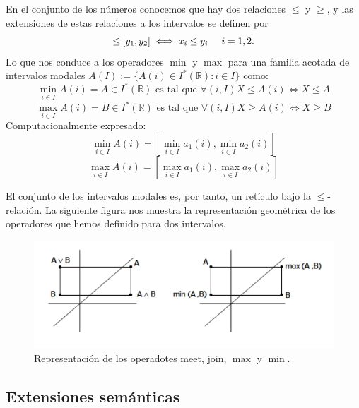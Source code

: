 En el conjunto de los números conocemos que hay dos relaciones $\leq$ y $\geq$, y las extensiones de estas relaciones a los intervalos se definen por
\begin{equation}
[x_1,x_2] \leq [y_1,y_2] \iff x_i \leq y_i \hspace{0.5cm} i = 1,2.
\nonumber
\end{equation}
Lo que nos conduce a los operadores $\min$ y $\max$ para una familia acotada de intervalos modales $A(I) := \{ A(i) \in I^*(\mathbb{R}) : i \in I \}$ como:
\begin{equation}
\min_{i \in I} A(i) = A \in I^*(\mathbb{R}) \text{ es  tal que } \forall (i,I) X \leq A(i) \iff X \leq A
\nonumber
\end{equation}
\begin{equation}
\max_{i \in I} A(i) = B \in I^*(\mathbb{R}) \text{ es  tal que } \forall (i,I) X \geq A(i) \iff X \geq B
\nonumber
\end{equation}
Computacionalmente expresado:
\begin{equation}
\min_{i \in I} A(i) = [\min_{i \in I} a_1(i), \min_{i \in I} a_2(i)]
\nonumber
\end{equation}
\begin{equation}
\max_{i \in I} A(i) = [\max_{i \in I} a_1(i), \max_{i \in I} a_2(i)]
\nonumber
\end{equation}

El conjunto de los intervalos modales es, por tanto, un retículo bajo la $\leq$-relación. La siguiente figura nos muestra la representación geométrica de los operadores que hemos definido para dos intervalos.
\begin{figure}[h]
\centering
\includegraphics[scale=0.5]{images/florez12.png}
\caption{Representación de los operadotes meet, join, $\max$ y $\min$.}
\end{figure}

\subsection{Extensiones semánticas}

